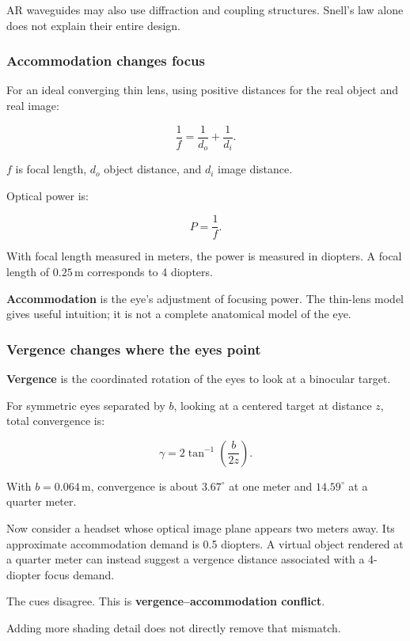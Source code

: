 AR waveguides may also use diffraction and coupling structures. Snell's law alone does not explain their entire design.

\subsubsection{Accommodation changes focus}\label{04-visual-computing-ii-ch043-accommodation-changes-focus}

For an ideal converging thin lens, using positive distances for the real object and real image:

\[
\frac1f=\frac1{d_o}+\frac1{d_i}.
\]

\(f\) is focal length, \(d_o\) object distance, and \(d_i\) image distance.

Optical power is:

\[
P=\frac1f.
\]

With focal length measured in meters, the power is measured in diopters. A focal length of \(0.25\,\mathrm{m}\) corresponds to 4 diopters.

\textbf{Accommodation} is the eye's adjustment of focusing power. The thin-lens model gives useful intuition; it is not a complete anatomical model of the eye.

\subsubsection{Vergence changes where the eyes point}\label{04-visual-computing-ii-ch043-vergence-changes-where-the-eyes-point}

\textbf{Vergence} is the coordinated rotation of the eyes to look at a binocular target.

For symmetric eyes separated by \(b\), looking at a centered target at distance \(z\), total convergence is:

\[
\gamma=2\tan^{-1}\left(\frac{b}{2z}\right).
\]

With \(b=0.064\,\mathrm{m}\), convergence is about \(3.67^\circ\) at one meter and \(14.59^\circ\) at a quarter meter.

Now consider a headset whose optical image plane appears two meters away. Its approximate accommodation demand is 0.5 diopters. A virtual object rendered at a quarter meter can instead suggest a vergence distance associated with a 4-diopter focus demand.

The cues disagree. This is \textbf{vergence--accommodation conflict}.

Adding more shading detail does not directly remove that mismatch.

